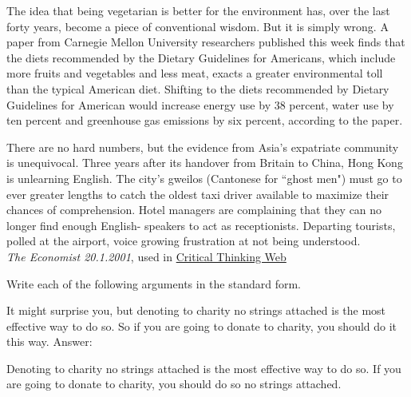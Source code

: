 \begin{practiceproblems}
\begin{problemslist}
	\item The idea that being vegetarian is better for the environment has, over the
	last forty years, become a piece of conventional wisdom. But it is simply
	wrong. A paper from Carnegie Mellon University researchers published
	this week finds that the diets recommended by the Dietary Guidelines for
	Americans, which include more fruits and vegetables and less meat, exacts
	a greater environmental toll than the typical American diet. Shifting to
	the diets recommended by Dietary Guidelines for American would increase
	energy use by 38 percent, water use by ten percent and greenhouse gas
	emissions by six percent, according to the paper.
	\item There are no hard numbers, but the evidence from Asia's expatriate community is unequivocal. Three years after its handover from Britain to China, Hong Kong is unlearning English. The city's gweilos (Cantonese for ``ghost men") must go to ever greater lengths to catch the oldest taxi driver available to maximize their chances of comprehension. Hotel managers are complaining that they can no longer find enough English- speakers to act as receptionists. Departing tourists, polled at the airport, voice growing frustration at not being understood. \\ \emph{The Economist 20.1.2001}, used in \href{https://philosophy.hku.hk/think/arg/arg.php}{Critical Thinking Web}
\end{problemslist}

\problempart
Write each of the following arguments in the standard form.
\begin{problemslist}
	\item[x.] It might surprise you, but denoting to charity no strings attached is the most effective way to do so. So if you are going to donate to charity, you should do it this way.
	\prem Answer:
	\begin{earg}
	\prem	Denoting to charity no strings attached is the most effective way to do so.
	\conc	If you are going to donate to charity, you should do so no strings attached.
	\end{earg}


\end{problemslist}
\end{practiceproblems}
